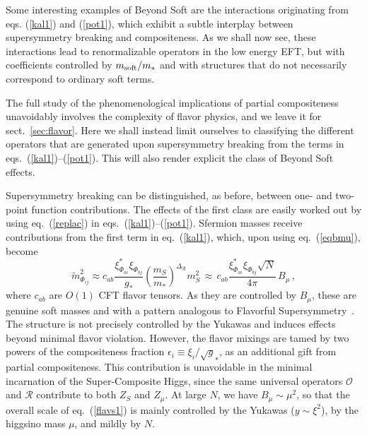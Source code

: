 \documentclass[a4paper,12pt]{article}
\newcommand{\beq}{\begin{equation}}
\newcommand{\eeq}{\end{equation}}
\def\eq#1{eq.~(\ref{#1})}
\def\eq#1{eq.~(\ref{#1})}
\def\sec#1{sect.~\ref{#1}}
\def\O{\mathcal{O}}
\def\R{\mathcal{R}}
\def\mst{m_*}
\def\mS{m_S}
\def\msoft{m_{\rm soft}}
\begin{document}
Some interesting examples of Beyond Soft are the interactions originating from eqs. (\ref{kal1}) and (\ref{pot1}), which exhibit a subtle interplay between supersymmetry breaking and compositeness. As we shall now see, these interactions lead to renormalizable operators in the low energy EFT, but with coefficients controlled by $\msoft/m_*$ and with structures that do not necessarily correspond to ordinary soft terms.

The full  study of the phenomenological implications  of partial compositeness unavoidably involves the  complexity of flavor physics, and we leave it for \sec{sec:flavor}.  Here  we shall instead limit ourselves to classifying the different operators that are generated upon supersymmetry breaking  from the terms in eqs.~(\ref{kal1})--(\ref{pot1}). This will also render explicit the class of Beyond Soft effects.

Supersymmetry breaking can be distinguished, as before, between one- and two-point function contributions. The effects of the first class are easily worked out by  using \eq{replac} in eqs.~(\ref{kal1})--(\ref{pot1}). 
Sfermion masses receive contributions from the first term in \eq{kal1}, which, upon  using \eq{eqbmu}, become
\beq
{{\tilde m}}^2_{\Phi_{ij}} \approx {c}_{ab}\frac{{\xi}_{\Phi_{ai}}^* {\xi}_{\Phi_{bj}}}{g_*} \left( \frac{\mS}{\mst} \right)^{\Delta_\R} \! \mS^2 
\, \approx\, {c}_{ab} \frac{  {\xi}_{\Phi_{ai}}^* {\xi}_{\Phi_{bj}}\sqrt{N}}{4\pi} \,B_\mu
\, , 
\label{flavs1}
\eeq
where $c_{ab}$ are  $O(1)$ CFT flavor tensors. As they are controlled by $B_\mu$, these are genuine soft masses and with  a pattern analogous to Flavorful Supersymmetry~\cite{Nomura:2007ap}. The structure is not precisely controlled by the Yukawas and induces effects beyond minimal flavor violation. However, the flavor mixings are tamed by two powers of the compositeness fraction $\epsilon_i\equiv \xi_i/\sqrt g_*$, as an additional gift from partial compositeness. This contribution 
is unavoidable in the minimal incarnation of the Super-Composite Higgs, 
since the same universal operators $\O$ and $\R$ contribute to both $Z_S$ and $Z_\mu$. At large $N$, we have   $B_\mu\sim \mu^2$, so that the overall scale of \eq{flavs1} is mainly controlled by the Yukawas ($y\sim \xi^2$), by the higgsino mass $\mu$, and mildly by $N$.
\end{document}
